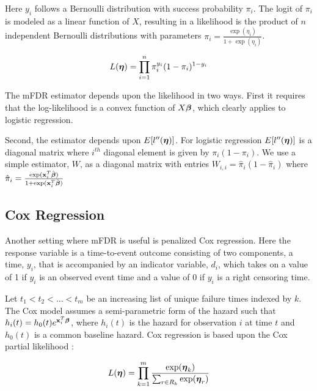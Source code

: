 Here $y_i$ follows a  Bernoulli distribution with success probability $\pi_i$.  The logit of $\pi_i$ is modeled as a linear function of $X$, resulting in a likelihood is the product of $n$ independent Bernoulli distributions with parameters $\pi_i = \frac{\exp(\eta_i)} {1 + \exp(\eta_i)}$.

\begin{equation*}
L(\boldsymbol{\eta}) = \prod_{i=1}^{n} \pi_i^{y_i} (1 - \pi_i)^{1 - y_i}
\end{equation*}

The mFDR estimator depends upon the likelihood in two ways.  First it requires that the log-likelihood is a convex function of $X\boldsymbol{\beta}$, which clearly applies to logistic regression.  

Second, the estimator depends upon $E[l''(\boldsymbol{\eta})]$.  For logistic regression $E[l''(\boldsymbol{\eta})]$ is a diagonal matrix where $i^{th}$ diagonal element is given by $\pi_i(1 - \pi_i)$.  We use a simple estimator, $W$, as a diagonal matrix with entries $W_{i,i} = \hat{\pi}_i(1 - \hat{\pi}_i)$ where $\hat{\pi}_i = \frac{\exp(\mathbf{x}_i^T\hat{\boldsymbol{\beta}})} {1 +\exp(\mathbf{x}_i^T\hat{\boldsymbol{\beta}})}$

\subsection{Cox Regression}

Another setting where mFDR is useful is penalized Cox regression. Here the response variable is a time-to-event outcome consisting of two components, a time, $y_i$, that is accompanied by an indicator variable, $d_i$, which takes on a value of 1 if $y_i$ is an observed event time and a value of 0 if $y_i$ is a right censoring time.  

Let $t_1 < t_2 < \ldots < t_m$ be an increasing list of unique failure times indexed by $k$. The Cox model assumes a semi-parametric form of the hazard such that $h_i(t) = h_0(t)e^{\mathbf{x}_i^T \boldsymbol{\beta}}$, where $h_i(t)$ is the hazard for observation $i$ at time $t$ and $h_0(t)$ is a common baseline hazard. Cox regression is based upon the Cox partial likelihood \citep{Cox1972}:

\begin{equation*}
L(\boldsymbol{\eta})  = \prod_{k=1}^{m} \frac{\exp(\boldsymbol{\eta}_k)}{\sum_{r \in R_k} \exp(\boldsymbol{\eta}_r) } 
\end{equation*}

